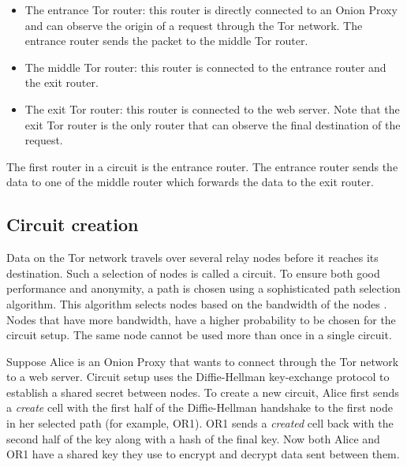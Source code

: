 \documentclass{article}
\begin{document}
		\begin{itemize}
			\item{The entrance Tor router:} this router is directly connected to an Onion Proxy and can observe the origin of a request through the Tor network. The entrance router sends the packet to the middle Tor router.
			\item{The middle Tor router:} this router is connected to the entrance router and the exit router.
			\item{The exit Tor router:} this router is connected to the web server. Note that the exit Tor router is the only router that can observe the final destination of the request.
		\end{itemize}
		
		The first router in a circuit is the entrance router. The entrance router sends the data to one of the middle router which forwards the data to the exit router.
			
	\subsection{Circuit creation}
		\label{ss:tor_circuit}
		
		Data on the Tor network travels over several relay nodes before it reaches its destination. Such a selection of nodes is called a circuit. To ensure both good performance and anonymity, a path is chosen using a sophisticated path selection algorithm. This algorithm selects nodes based on the bandwidth of the nodes \cite{wang2012congestion}. Nodes that have more bandwidth, have a higher probability to be chosen for the circuit setup. The same node cannot be used more than once in a single circuit.
		
		
		
		Suppose Alice is an Onion Proxy that wants to connect through the Tor network to a web server. Circuit setup uses the Diffie-Hellman key-exchange protocol \cite{diffiehellman} to establish a shared secret between nodes. To create a new circuit, Alice first sends a \emph{create} cell with the first half of the Diffie-Hellman handshake to the first node in her selected path (for example, OR1). OR1 sends a \emph{created} cell back with the second half of the key along with a hash of the final key. Now both Alice and OR1 have a shared key they use to encrypt and decrypt data sent between them.
		
\end{document}
